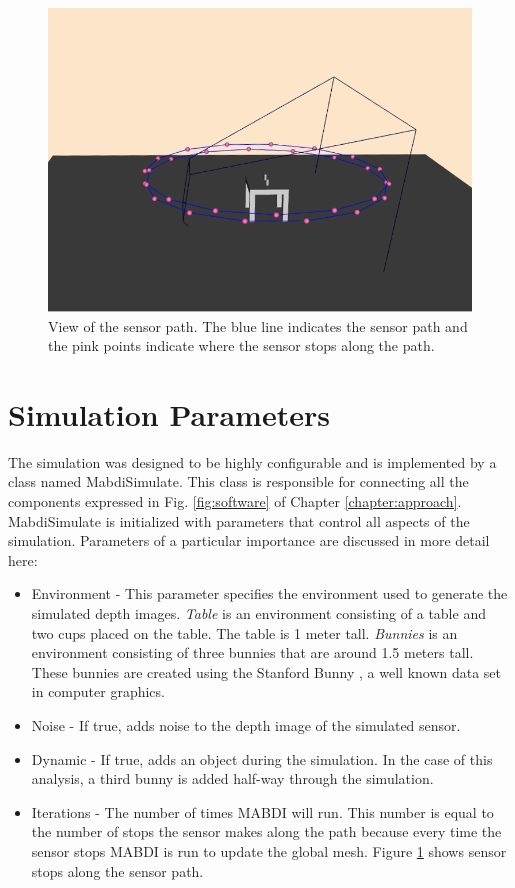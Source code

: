 \begin{figure}[h]%
\centering
  \includegraphics[width=.70\textwidth]{figures/diagram_path.png}
  \caption{View of the sensor path. The blue line indicates the sensor path and the pink points indicate where the sensor stops along the path.}
  \label{fig:sensor_path}
\end{figure}

\section{Simulation Parameters}

The simulation was designed to be highly configurable and is implemented by a
class named MabdiSimulate. This class is responsible for connecting all the
components expressed in Fig. \ref{fig:software} of Chapter
\ref{chapter:approach}. MabdiSimulate is initialized with parameters that
control all aspects of the simulation. Parameters of a particular importance are
discussed in more detail here:

\begin{itemize}
    \item Environment - This parameter specifies the environment used to generate
    the simulated depth images. \textit{Table} is an environment consisting of a
    table and two cups placed on the table. The table is 1 meter tall.
    \textit{Bunnies} is an environment consisting of three bunnies that are
    around 1.5 meters tall. These bunnies are created using the Stanford Bunny
    \cite{Turk1994}, a well known data set in computer graphics.
    \item Noise - If true, adds noise to the depth image of the simulated sensor.
    \item Dynamic - If true, adds an object during the simulation. In the case
    of this analysis, a third bunny is added half-way through the simulation.
    \item Iterations - The number of times MABDI will run. This number is equal to the number of stops the sensor makes along the path because every time the sensor stops MABDI is run to update the global mesh. Figure \ref{fig:sensor_path} shows sensor stops along the sensor path.
\end{itemize}

